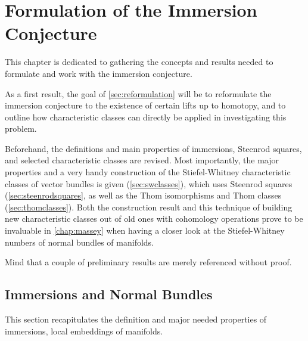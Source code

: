 % 

\chapter{Formulation of the Immersion Conjecture}
This chapter is dedicated to gathering the concepts and results needed
to formulate and work with the immersion conjecture.

As a first result, the goal of \autoref{sec:reformulation} will be to
reformulate the immersion conjecture to the existence of certain
lifts up to homotopy, and to outline how characteristic 
classes can directly be applied in investigating this problem.

Beforehand, the definitions and main properties of immersions,
Steenrod squares, and selected characteristic classes are
revised. Most importantly, the major properties and a very handy
construction of the Stiefel-Whitney characteristic classes of vector
bundles is given (\autoref{sec:swclasses}), which uses Steenrod
squares (\autoref{sec:steenrodsquares}, as well as 
the Thom isomorphisms and Thom classes (\autoref{sec:thomclasses}).
Both the construction result and this technique of building new
characteristic classes out of old ones with cohomology operations
prove to be invaluable in \autoref{chap:massey} when having a closer
look at the Stiefel-Whitney numbers of normal bundles of manifolds.

Mind that a couple of preliminary results are merely referenced
without proof.

\section{Immersions and Normal Bundles}\label{sec:immersions}
This section recapitulates the definition and major needed properties
of immersions, \idest local embeddings of manifolds.

